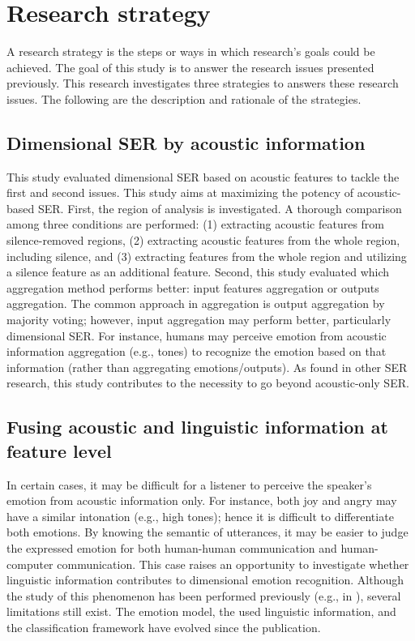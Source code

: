 \section{Research strategy}
A research strategy is the steps or ways in which research's goals could be
achieved. The goal of this study is to answer the research issues presented
previously. This research investigates three strategies to answers these
research issues. The following are the description and rationale of the
strategies.

\subsection{Dimensional SER by acoustic information}
This study evaluated dimensional SER based on acoustic features to tackle the
first and second issues.  This study aims at maximizing the potency of
acoustic-based SER. First, the region of analysis is investigated. A thorough
comparison among three conditions are performed: (1) extracting acoustic
features from silence-removed regions, (2) extracting acoustic features from
the whole region, including silence, and (3) extracting features from the whole
region and utilizing a silence feature as an additional feature. Second, this
study evaluated which aggregation method performs better: input features
aggregation or outputs aggregation. The common approach in aggregation is
output aggregation by majority voting; however, input aggregation may perform
better, particularly dimensional SER. For instance, humans may perceive emotion
from acoustic information aggregation (e.g., tones) to recognize the emotion
based on that information (rather than aggregating emotions/outputs). As found
in other SER research, this study contributes to the necessity to go beyond
acoustic-only SER.

\subsection{Fusing acoustic and linguistic information at feature level}
In certain cases, it may be difficult for a listener to perceive the speaker's
emotion from acoustic information only. For instance, both joy and angry may
have a similar intonation (e.g., high tones); hence it is difficult to
differentiate both emotions. By knowing the semantic of utterances, it may be
easier to judge the expressed emotion for both human-human communication and
human-computer communication.  This case raises an opportunity to investigate
whether linguistic information contributes to dimensional emotion recognition.
Although the study of this phenomenon has been performed previously (e.g., in
\cite{Karadogan2012}), several limitations still exist. The emotion model, the
used linguistic information, and the classification framework have evolved
since the publication.

